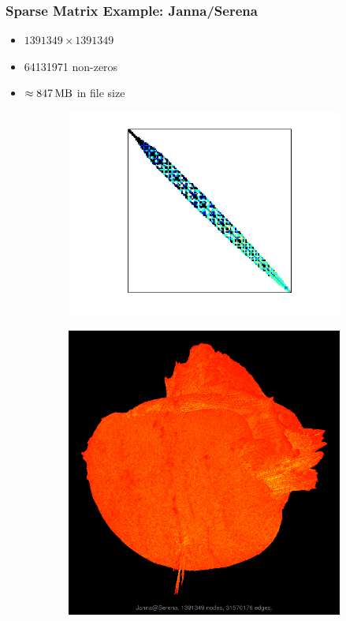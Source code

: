 \documentclass[t,12pt,numbers,fleqn]{beamer}
\begin{document}

\begin{frame}
\frametitle{Sparse Matrix Example: Janna/Serena}

\begin{itemize}
\item \(\num{1391349} \times \num{1391349}\)
\item \num{64131971} non-zeros
\item \(\approx \SI{847}{\mega\byte}\) in file size
\end{itemize}

\begin{figure}[hh]
  \centering
  \begin{subfigure}[b]{0.5\textwidth}
    \centering
    \includegraphics[width=\textwidth,trim={2cm 1.5cm 2cm 1cm},clip]{figures/Serena}
  \end{subfigure}
  \begin{subfigure}[b]{0.37\textwidth}
    \centering
    \includegraphics[width=\textwidth]{figures/Serena_graph}

\end{subfigure}
\end{figure}
\end{frame}
\end{document}
